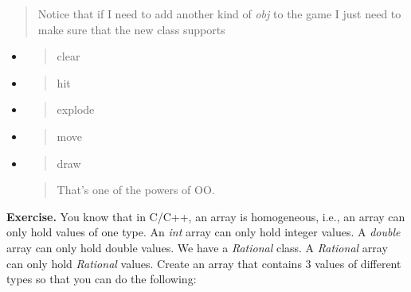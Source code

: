 \documentclass[
]{article}
\begin{document}
\begin{quote}
Notice that if I need to add another kind of \emph{obj} to the game I
just need to make sure that the new class supports
\end{quote}

\begin{itemize}
\item
  \begin{quote}
  clear
  \end{quote}
\end{itemize}

\begin{itemize}
\item
  \begin{quote}
  hit
  \end{quote}
\item
  \begin{quote}
  explode
  \end{quote}
\item
  \begin{quote}
  move
  \end{quote}
\item
  \begin{quote}
  draw
  \end{quote}

  \begin{quote}
  That's one of the powers of OO.
  \end{quote}
\end{itemize}

\begin{quote}
\end{quote}

\textbf{Exercise.} You know that in C/C++, an array is homogeneous,
i.e., an array can only hold values of one type. An \emph{int} array can
only hold integer values. A \emph{double} array can only hold double
values. We have a \emph{Rational} class. A \emph{Rational} array can
only hold \emph{Rational} values. Create an array that contains 3 values
of different types so that you can do the following:
\end{document}
